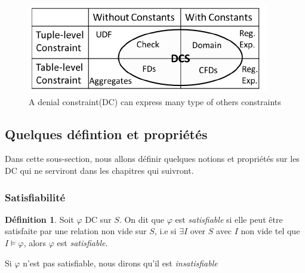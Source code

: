 \documentclass[letterpaper, 12pt]{report}
\theoremstyle{definition}
\newtheorem{mydef}{Définition}
\begin{document}
 
\begin{figure}
	\centering
	\includegraphics[scale=1]{img/quadran.png}
	\caption{A denial constraint(DC) can express many type of others constraints}
\end{figure}


\subsection{Quelques défintion et propriétés}

Dans cette sous-section, nous allons définir quelques notions et propriétés sur les DC qui ne serviront dans les chapitres qui suivront.
\subsubsection{Satisfiabilité}

\begin{mydef}
Soit $\varphi$ DC sur $S$. On dit que $\varphi$ est \emph{satisfiable} si elle peut être satisfaite par une relation non vide sur $S$, i.e si $\exists I$ over $S$ avec $I$ non vide tel que $I \models \varphi$, alors $\varphi$ est \emph{satisfiable}.

Si $\varphi$ n'est pas satisfiable, nous dirons qu'il est \emph{insatisfiable} 
\end{mydef}
\end{document}
